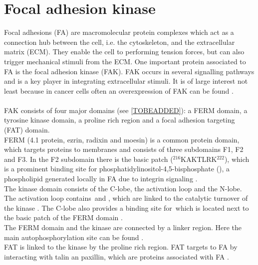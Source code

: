 \section{Focal adhesion kinase}
Focal adhesions (FA) are macromolecular protein complexes which act as a connection hub between the cell, i.e. the cytoskeleton, and the extracellular matrix (ECM). They enable the cell to performing tension forces, but can also trigger mechanical stimuli from the ECM. One important protein associated to FA is the focal adhesion kinase (FAK). FAK occurs in several signalling pathways and is a key player in integrating extracellular stimuli. It is of large interest not least because in cancer cells often an overexpression of FAK can be found \autocite{cancerFAK}.\\
\\
FAK consists of four major domains (see \autoref{TOBEADDED}): a FERM domain, a tyrosine kinase domain, a proline rich region and a focal adhesion targeting (FAT) domain.\\
FERM (4.1 protein, ezrin, radixin and moesin) is a common protein domain, which targets proteins to membranes \autocite{fermdomain} and consists of three subdomains F1, F2 and F3. In the F2 subdomain there is the basic patch  ($^{216}$KAKTLRK$^{222}$), which is a prominent binding site for phosphatidylinositol-4,5-bisphosphate (\pip), a phospholipid generated locally in FA due to integrin signaling \autocite{pap001}.\\
The kinase domain consists of the C-lobe, the activation loop and the N-lobe. The activation loop contains \,and , which are linked to the catalytic turnover of the kinase \autocite{tyrosinePhosphor}. The C-lobe also provides a binding site for \pip\,which is located next to the basic patch of the FERM domain \autocite{pap002}.\\
The FERM domain and the kinase are connected by a linker region. Here the main autophosphorylation site  can be found \autocite{pap001}.\\
FAT is linked to the kinase by the proline rich region. FAT targets to FA by interacting with talin an paxillin, which are proteins associated with FA \autocite{fatdomain}.\\
\\
